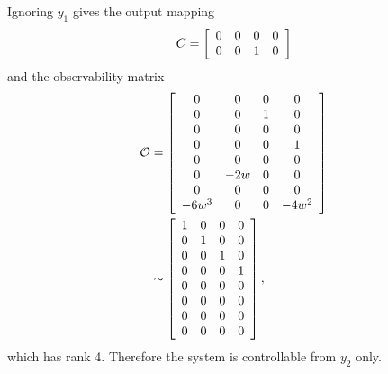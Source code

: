 \documentclass{article}
\begin{document}
\begin{enumerate}[(a)]
{        Ignoring $y_1$ gives the output mapping
        $$
        C = \left[\begin{array}{c c c c}
              0 & 0 & 0 & 0 \\ 0 & 0 & 1 & 0
            \end{array}\right]
        $$
        and the observability matrix
        \begin{align*}
          \mathcal{O} &=
          \left[\begin{array}{c c c c}
                0 &   0 & 0 &    0 \\
                0 &   0 & 1 &    0 \\
                0 &   0 & 0 &    0 \\
                0 &   0 & 0 &    1 \\
                0 &   0 & 0 &    0 \\
                0 & -2w & 0 &    0 \\
                0 &   0 & 0 &    0 \\
            -6w^3 &   0 & 0 & -4w^2
          \end{array}\right] \\
        &\sim
          \left[\begin{array}{c c c c}
            1 & 0 & 0 & 0 \\
            0 & 1 & 0 & 0 \\
            0 & 0 & 1 & 0 \\
            0 & 0 & 0 & 1 \\
            0 & 0 & 0 & 0 \\
            0 & 0 & 0 & 0 \\
            0 & 0 & 0 & 0 \\
            0 & 0 & 0 & 0
          \end{array}\right],
        \end{align*}
        which has rank 4. Therefore the system is controllable from
        $y_2$ only.
      }
\end{enumerate}
\end{document}

